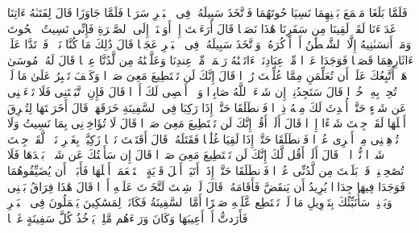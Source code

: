 \startbuffer[\q:18:61]
فَلَمَّا بَلَغَا مَجۡمَعَ بَیۡنِهِمَا نَسِیَا حُوتَهُمَا فَٱتَّخَذَ سَبِیلَهُۥ فِی ٱلۡبَحۡرِ سَرَبࣰا%
\stopbuffer%
\startbuffer[\q:18:62]
فَلَمَّا جَاوَزَا قَالَ لِفَتَىٰهُ ءَاتِنَا غَدَاۤءَنَا لَقَدۡ لَقِینَا مِن سَفَرِنَا هَٰذَا نَصَبࣰا%
\stopbuffer%
\startbuffer[\q:18:63]
قَالَ أَرَءَیۡتَ إِذۡ أَوَیۡنَاۤ إِلَى ٱلصَّخۡرَةِ فَإِنِّی نَسِیتُ ٱلۡحُوتَ وَمَاۤ أَنسَىٰنِیهُ إِلَّا ٱلشَّیۡطَٰنُ أَنۡ أَذۡكُرَهُۥۚ وَٱتَّخَذَ سَبِیلَهُۥ فِی ٱلۡبَحۡرِ عَجَبࣰا%
\stopbuffer%
\startbuffer[\q:18:64]
قَالَ ذَٰلِكَ مَا كُنَّا نَبۡغِۚ فَٱرۡتَدَّا عَلَىٰۤ ءَاثَارِهِمَا قَصَصࣰا%
\stopbuffer%
\startbuffer[\q:18:65]
فَوَجَدَا عَبۡدࣰا مِّنۡ عِبَادِنَاۤ ءَاتَیۡنَٰهُ رَحۡمَةࣰ مِّنۡ عِندِنَا وَعَلَّمۡنَٰهُ مِن لَّدُنَّا عِلۡمࣰا%
\stopbuffer%
\startbuffer[\q:18:66]
قَالَ لَهُۥ مُوسَىٰ هَلۡ أَتَّبِعُكَ عَلَىٰۤ أَن تُعَلِّمَنِ مِمَّا عُلِّمۡتَ رُشۡدࣰا%
\stopbuffer%
\startbuffer[\q:18:67]
قَالَ إِنَّكَ لَن تَسۡتَطِیعَ مَعِیَ صَبۡرࣰا%
\stopbuffer%
\startbuffer[\q:18:68]
وَكَیۡفَ تَصۡبِرُ عَلَىٰ مَا لَمۡ تُحِطۡ بِهِۦ خُبۡرࣰا%
\stopbuffer%
\startbuffer[\q:18:69]
قَالَ سَتَجِدُنِیۤ إِن شَاۤءَ ٱللَّهُ صَابِرࣰا وَلَاۤ أَعۡصِی لَكَ أَمۡرࣰا%
\stopbuffer%
\startbuffer[\q:18:70]
قَالَ فَإِنِ ٱتَّبَعۡتَنِی فَلَا تَسۡءَلۡنِی عَن شَیۡءٍ حَتَّىٰۤ أُحۡدِثَ لَكَ مِنۡهُ ذِكۡرࣰا%
\stopbuffer%
\startbuffer[\q:18:71]
فَٱنطَلَقَا حَتَّىٰۤ إِذَا رَكِبَا فِی ٱلسَّفِینَةِ خَرَقَهَاۖ قَالَ أَخَرَقۡتَهَا لِتُغۡرِقَ أَهۡلَهَا لَقَدۡ جِئۡتَ شَیۡءًا إِمۡرࣰا%
\stopbuffer%
\startbuffer[\q:18:72]
قَالَ أَلَمۡ أَقُلۡ إِنَّكَ لَن تَسۡتَطِیعَ مَعِیَ صَبۡرࣰا%
\stopbuffer%
\startbuffer[\q:18:73]
قَالَ لَا تُؤَاخِذۡنِی بِمَا نَسِیتُ وَلَا تُرۡهِقۡنِی مِنۡ أَمۡرِی عُسۡرࣰا%
\stopbuffer%
\startbuffer[\q:18:74]
فَٱنطَلَقَا حَتَّىٰۤ إِذَا لَقِیَا غُلَٰمࣰا فَقَتَلَهُۥ قَالَ أَقَتَلۡتَ نَفۡسࣰا زَكِیَّةَۢ بِغَیۡرِ نَفۡسࣲ لَّقَدۡ جِئۡتَ شَیۡءࣰا نُّكۡرࣰا%
\stopbuffer%
\startbuffer[\q:18:75]
۞ قَالَ أَلَمۡ أَقُل لَّكَ إِنَّكَ لَن تَسۡتَطِیعَ مَعِیَ صَبۡرࣰا%
\stopbuffer%
\startbuffer[\q:18:76]
قَالَ إِن سَأَلۡتُكَ عَن شَیۡءِۭ بَعۡدَهَا فَلَا تُصَٰحِبۡنِیۖ قَدۡ بَلَغۡتَ مِن لَّدُنِّی عُذۡرࣰا%
\stopbuffer%
\startbuffer[\q:18:77]
فَٱنطَلَقَا حَتَّىٰۤ إِذَاۤ أَتَیَاۤ أَهۡلَ قَرۡیَةٍ ٱسۡتَطۡعَمَاۤ أَهۡلَهَا فَأَبَوۡا۟ أَن یُضَیِّفُوهُمَا فَوَجَدَا فِیهَا جِدَارࣰا یُرِیدُ أَن یَنقَضَّ فَأَقَامَهُۥۖ قَالَ لَوۡ شِئۡتَ لَتَّخَذۡتَ عَلَیۡهِ أَجۡرࣰا%
\stopbuffer%
\startbuffer[\q:18:78]
قَالَ هَٰذَا فِرَاقُ بَیۡنِی وَبَیۡنِكَۚ سَأُنَبِّئُكَ بِتَأۡوِیلِ مَا لَمۡ تَسۡتَطِع عَّلَیۡهِ صَبۡرًا%
\stopbuffer%
\startbuffer[\q:18:79]
أَمَّا ٱلسَّفِینَةُ فَكَانَتۡ لِمَسَٰكِینَ یَعۡمَلُونَ فِی ٱلۡبَحۡرِ فَأَرَدتُّ أَنۡ أَعِیبَهَا وَكَانَ وَرَاۤءَهُم مَّلِكࣱ یَأۡخُذُ كُلَّ سَفِینَةٍ غَصۡبࣰا%
